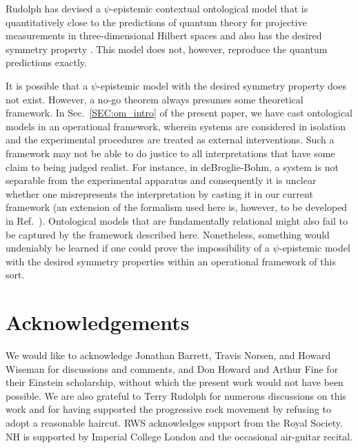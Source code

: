 \documentclass[aps,nofootinbib,12pt]{revtex4-2}
\begin{document}
Rudolph has devised a $\psi$-epistemic contextual ontological model
that is quantitatively close to the predictions of quantum theory
for projective measurements in three-dimensional Hilbert spaces and
also has the desired symmetry property \cite{tr_model}. This model
does not, however, reproduce the quantum predictions exactly.

It is possible that a $\psi$-epistemic model with the desired
symmetry property does not exist.  However, a no-go theorem always
presumes some theoretical framework. In Sec.~\ref{SEC:om_intro} of
the present paper, we have cast ontological models in an operational
framework, wherein systems are considered in isolation and the
experimental procedures are treated as external interventions. Such
a framework may not be able to do justice to all interpretations
that have some claim to being judged realist. For instance, in
deBroglie-Bohm, a system is not separable from the experimental
apparatus and consequently it is unclear whether one misrepresents
the interpretation by casting it in our current framework (an
extension of the formalism used here is, however, to be developed in
Ref.~\cite{deficiency}). Ontological models that are fundamentally
relational might also fail to be captured by the framework described
here. Nonetheless, something would undeniably be learned if one
could prove the impossibility of a $\psi$-epistemic model with the
desired symmetry properties within an operational framework of this
sort.

\section{Acknowledgements}

We would like to acknowledge Jonathan Barrett, Travis Norsen, and
Howard Wiseman for discussions and comments, and Don Howard and
Arthur Fine for their Einstein scholarship, without which the
present work would not have been possible. We are also grateful to
Terry Rudolph for numerous discussions on this work and for having
supported the progressive rock movement by refusing to adopt a
reasonable haircut. RWS acknowledges support from the Royal Society.
NH is supported by Imperial College London and the occasional
air-guitar recital.
\end{document}
